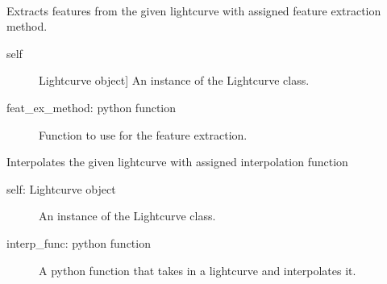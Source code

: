 \documentclass[a4paper,10pt,english]{sphinxmanual}
\begin{document}
\begin{fulllineitems}
\label{\detokenize{api:malt.Lightcurve}}~

\begin{fulllineitems}
\label{\detokenize{api:malt.Lightcurve.extract_features}}
Extracts features from the given lightcurve with assigned
feature extraction method.
\begin{description}
\item[{self}] \leavevmode{[}Lightcurve object{]}
An instance of the Lightcurve class.

\item[{feat\_ex\_method: python function}] \leavevmode
Function to use for the feature extraction.

\end{description}

\end{fulllineitems}


\begin{fulllineitems}
\label{\detokenize{api:malt.Lightcurve.interpolate}}
Interpolates the given lightcurve with assigned interpolation function
\begin{description}
\item[{self: Lightcurve object}] \leavevmode
An instance of the Lightcurve class.

\item[{interp\_func: python function}] \leavevmode
A python function that takes in a lightcurve and interpolates it.


\end{description}
\end{fulllineitems}
\end{fulllineitems}
\end{document}
